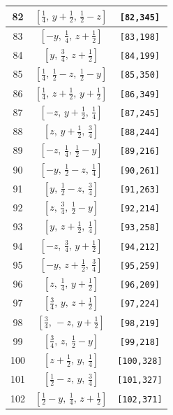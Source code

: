 \documentclass[fleqn,8pt]{jsarticle}
\begin{document}
\begin{longtable}{ccc}
82 & $\left[ \frac{1}{4},\, y + \frac{1}{2},\, \frac{1}{2} - z \right]$ & {\tt [82,345]} \\ \hline
83 & $\left[ - y,\, \frac{1}{4},\, z + \frac{1}{2} \right]$ & {\tt [83,198]} \\ \hline
84 & $\left[ y,\, \frac{3}{4},\, z + \frac{1}{2} \right]$ & {\tt [84,199]} \\ \hline
85 & $\left[ \frac{1}{4},\, \frac{1}{2} - z,\, \frac{1}{2} - y \right]$ & {\tt [85,350]} \\ \hline
86 & $\left[ \frac{1}{4},\, z + \frac{1}{2},\, y + \frac{1}{2} \right]$ & {\tt [86,349]} \\ \hline
87 & $\left[ - z,\, y + \frac{1}{2},\, \frac{1}{4} \right]$ & {\tt [87,245]} \\ \hline
88 & $\left[ z,\, y + \frac{1}{2},\, \frac{3}{4} \right]$ & {\tt [88,244]} \\ \hline
89 & $\left[ - z,\, \frac{1}{4},\, \frac{1}{2} - y \right]$ & {\tt [89,216]} \\ \hline
90 & $\left[ - y,\, \frac{1}{2} - z,\, \frac{1}{4} \right]$ & {\tt [90,261]} \\ \hline
91 & $\left[ y,\, \frac{1}{2} - z,\, \frac{3}{4} \right]$ & {\tt [91,263]} \\ \hline
92 & $\left[ z,\, \frac{3}{4},\, \frac{1}{2} - y \right]$ & {\tt [92,214]} \\ \hline
93 & $\left[ y,\, z + \frac{1}{2},\, \frac{1}{4} \right]$ & {\tt [93,258]} \\ \hline
94 & $\left[ - z,\, \frac{3}{4},\, y + \frac{1}{2} \right]$ & {\tt [94,212]} \\ \hline
95 & $\left[ - y,\, z + \frac{1}{2},\, \frac{3}{4} \right]$ & {\tt [95,259]} \\ \hline
96 & $\left[ z,\, \frac{1}{4},\, y + \frac{1}{2} \right]$ & {\tt [96,209]} \\ \hline
97 & $\left[ \frac{3}{4},\, y,\, z + \frac{1}{2} \right]$ & {\tt [97,224]} \\ \hline
98 & $\left[ \frac{3}{4},\, - z,\, y + \frac{1}{2} \right]$ & {\tt [98,219]} \\ \hline
99 & $\left[ \frac{3}{4},\, z,\, \frac{1}{2} - y \right]$ & {\tt [99,218]} \\ \hline
100 & $\left[ z + \frac{1}{2},\, y,\, \frac{1}{4} \right]$ & {\tt [100,328]} \\ \hline
101 & $\left[ \frac{1}{2} - z,\, y,\, \frac{3}{4} \right]$ & {\tt [101,327]} \\ \hline
102 & $\left[ \frac{1}{2} - y,\, \frac{1}{4},\, z + \frac{1}{2} \right]$ & {\tt [102,371]} \\ \hline

\end{longtable}
\end{document}
